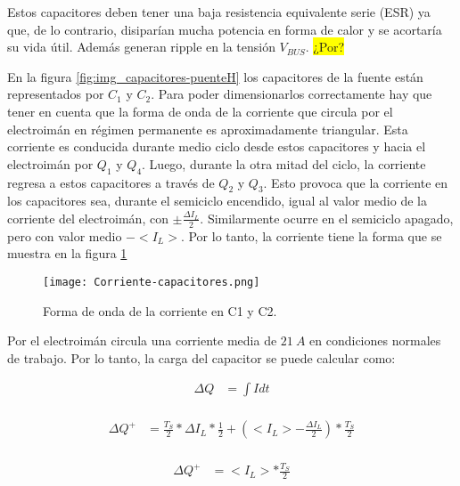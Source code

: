 \noindent Estos capacitores deben tener una baja resistencia equivalente serie (ESR) ya que, de lo contrario, disiparían mucha potencia en forma de calor y se acortaría su vida útil. Además generan ripple en la tensión $V_{BUS}$. \colorbox{yellow}{¿Por?}

\noindent En la figura \ref{fig:img_capacitores-puenteH} los capacitores de la fuente están representados por $C_1$ y $C_2$. Para poder dimensionarlos correctamente hay que tener en cuenta que la forma de onda de la corriente que circula por el electroimán en régimen permanente es aproximadamente triangular. Esta corriente es conducida durante medio ciclo desde estos capacitores y hacia el electroimán por $Q_1$ y $Q_4$. Luego, durante la otra mitad del ciclo, la corriente regresa a estos capacitores a través de $Q_2$ y $Q_3$. Esto provoca que la corriente en los capacitores sea, durante el semiciclo encendido, igual al valor medio de la corriente del electroimán, con $ \pm \frac{\Delta I_L}{2}$. Similarmente ocurre en el semiciclo apagado, pero con valor medio $-<I_L>$.  Por lo tanto,  la corriente tiene la forma que se muestra en la figura \ref{fig:img_ccorriente-capacitores}

\begin{figure}[H]
	\centering
	\texttt{[image: Corriente-capacitores.png]}
	\caption{Forma de onda de la corriente en C1 y C2.}
	\label{fig:img_ccorriente-capacitores}
\end{figure}

\noindent Por el electroimán circula una corriente media de $21\:A$ en condiciones normales de trabajo. Por lo tanto, la carga del capacitor se puede calcular como:

\begin{equation} 
	\begin{aligned}
   	\Delta Q &= \int I dt\\	
	\end{aligned}
\end{equation}

\begin{equation} 
	\begin{aligned}
		\Delta Q ^+ &= \frac{T_S}{2}*\Delta I_L * \frac{1}{2} + (<I_L> -\frac{\Delta I_L}{2})*\frac{T_S}{2}\\
	\end{aligned}
\end{equation}

\begin{equation} 
	\begin{aligned}
		\Delta Q ^+ &= <I_L> *\frac{T_S}{2}\\
	\end{aligned}
\end{equation}

